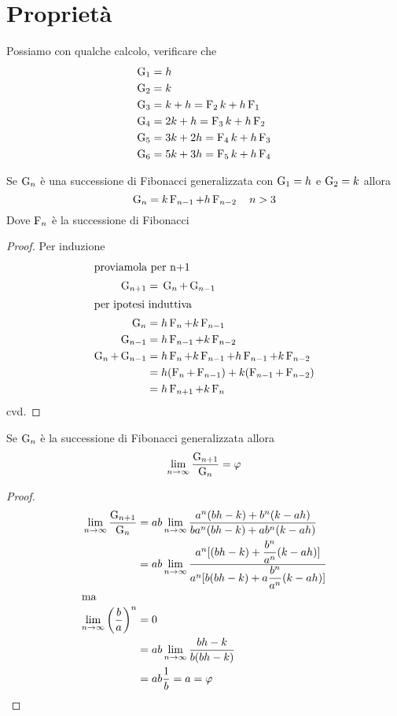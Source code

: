 \section{Proprietà}
Possiamo con qualche calcolo, verificare che
\begin{align*}
\operatorname{G}_{1}={}&h\\
\operatorname{G}_{2}={}&k\\
\operatorname{G}_{3}={}&k+h=\operatorname{F}_{2}k+h\operatorname{F}_{1}\\
\operatorname{G}_{4}={}&2k+h=\operatorname{F}_{3}k+h\operatorname{F}_{2}\\
\operatorname{G}_{5}={}&3k+2h=\operatorname{F}_{4}k+h\operatorname{F}_{3}\\
\operatorname{G}_{6}={}&5k+3h=\operatorname{F}_{5}k+h\operatorname{F}_{4}
\end{align*} 
\begin{thm}[Derivazione]
	Se $\operatorname{G}_{n}$ è una successione di Fibonacci generalizzata  con $\operatorname{G}_{1}=h$ e $\operatorname{G}_{2}=k $ allora
	\begin{equation}
		\operatorname{G}_{n}=k\operatorname{F}_{n-1}+h\operatorname{F}_{n-2}\quad n>3
	\end{equation}\label{thm:FibGenDer}
	Dove $\operatorname{F}_{n}$ è la successione di Fibonacci
\end{thm}
\begin{proof}
Per induzione
\begin{align*}
\intertext{proviamola per n+1}
		\operatorname{G}_{n+1}={}&\operatorname{G}_{n}+\operatorname{G}_{n-1}\\
\intertext{per ipotesi induttiva}
\operatorname{G}_{n}={}&h\operatorname{F}_{n}+k\operatorname{F}_{n-1}\\
\operatorname{G}_{n-1}={}&h\operatorname{F}_{n-1}+k\operatorname{F}_{n-2}\\
\operatorname{G}_{n}+\operatorname{G}_{n-1}={}&h\operatorname{F}_{n}+k\operatorname{F}_{n-1}+h\operatorname{F}_{n-1}+k\operatorname{F}_{n-2}\\
={}&h(\operatorname{F}_{n}+\operatorname{F}_{n-1})+k(\operatorname{F}_{n-1}+\operatorname{F}_{n-2})\\
={}&h\operatorname{F}_{n+1}+k\operatorname{F}_{n}\\
\end{align*}
cvd.
\end{proof}
\begin{thm}
	Se $\operatorname{G}_{n}$ è la successione di Fibonacci generalizzata allora 
	\begin{equation}
		\lim_{n\to\infty}\dfrac{\operatorname{G}_{n+1}}{\operatorname{G}_{n}}=\varphi
	\end{equation}\label{eqn:FibLimRapGen}
\end{thm}
\begin{proof}
	\begin{align*}
		\lim_{n\to\infty}\dfrac{\operatorname{G}_{n+1}}{\operatorname{G}_{n}}={}&ab\lim_{n\to\infty}\dfrac{a^n(bh-k)+b^n(k-ah)}{ba^n(bh-k)+ab^n(k-ah)}\\
		={}&ab\lim_{n\to\infty}\dfrac{a^n[(bh-k)+\dfrac{b^n}{a^n}(k-ah)]}{a^n[b(bh-k)+a\dfrac{b^n}{a^n}(k-ah)]}\\
		\intertext{ma}
	\lim_{n\to\infty}\left(\dfrac{b}{a}\right)^n={}&0\\
={}&ab\lim_{n\to\infty}\dfrac{bh-k}{b(bh-k)}\\
={}&ab\dfrac{1}{b}=a=\varphi\\
	\end{align*}
 \end{proof}
